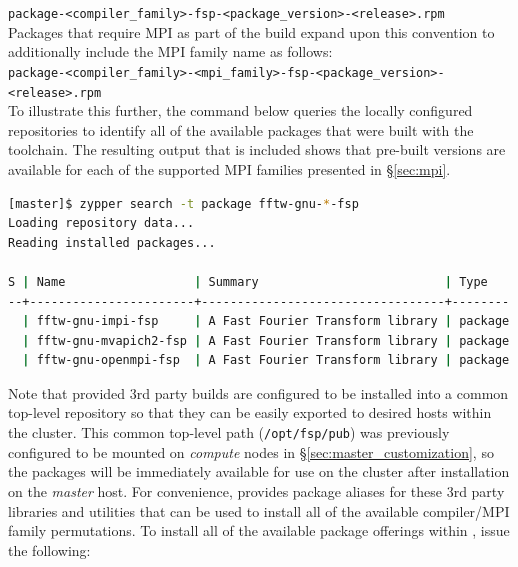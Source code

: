\documentclass[letterpaper]{article}
\begin{document}
\noindent
\texttt{package-<compiler\_family>-fsp-<package\_version>-<release>.rpm} \\

\noindent Packages that require MPI as part of the build expand upon this convention to
additionally include the MPI family name as follows: \\

\noindent
\texttt{package-<compiler\_family>-<mpi\_family>-fsp-<package\_version>-<release>.rpm} \\

To illustrate this further, the command below queries the locally configured
repositories to identify all of the available \FFTW{} packages that were built
with the \GNU{} toolchain. The resulting output that is included shows that
pre-built versions are available for each of the supported MPI families
presented in \S\ref{sec:mpi}.

\begin{lstlisting}[language=bash]
[master]$ zypper search -t package fftw-gnu-*-fsp
Loading repository data...
Reading installed packages...

S | Name                  | Summary                          | Type   
--+-----------------------+----------------------------------+--------
  | fftw-gnu-impi-fsp     | A Fast Fourier Transform library | package
  | fftw-gnu-mvapich2-fsp | A Fast Fourier Transform library | package
  | fftw-gnu-openmpi-fsp  | A Fast Fourier Transform library | package
\end{lstlisting}

Note that \FSP{} provided 3rd party builds are configured to be installed
into a common top-level repository so that they can be easily exported to
desired hosts within the cluster. This common top-level path
(\texttt{/opt/fsp/pub}) was previously configured to be mounted on {\em
  compute} nodes in \S\ref{sec:master_customization}, so the packages will be
immediately available for use on the cluster after installation on the {\em
  master} host.  For convenience, \FSP{} provides package aliases for these 3rd
party libraries and utilities that can be used to install all of the available
compiler/MPI family permutations. To install all of the available package
offerings within \FSP{}, issue the following:
\end{document}
